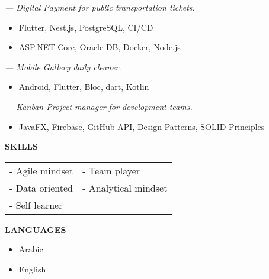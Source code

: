 

 \textit{— Digital Payment for public transportation tickets.}
\begin{itemize}
	\item Flutter, Nest.js, PostgreSQL, CI/CD
\end{itemize}

\smallskip

\smallskip
{}
\begin{itemize}
	\item ASP.NET Core, Oracle DB, Docker, Node.js
\end{itemize}

\medskip
{} \textit{— Mobile Gallery daily cleaner.}
\begin{itemize}
	\item Android, Flutter, Bloc, dart, Kotlin
\end{itemize}

\medskip
{} \textit{— Kanban Project manager for development teams.}
\begin{itemize}
	\item JavaFX, Firebase, GitHub API, Design Patterns, SOLID Principles
\end{itemize}


\textcolor{VividPurple}{\textbf{SKILLS}}
\smallskip
\begin{tabular}{ l l } 
	- Agile mindset & - Team player         \\
	- Data oriented & - Analytical mindset  \\
    - Self learner                          \\
\end{tabular}

\textcolor{VividPurple}{\textbf{LANGUAGES}}
\smallskip
\begin{itemize}
	\item Arabic
	\item English
\end{itemize}    
